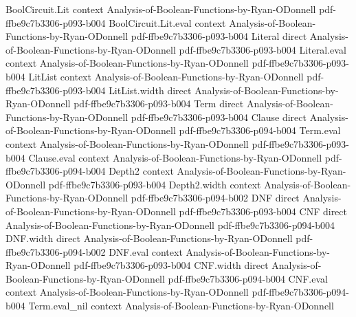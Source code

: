 \begin{theorem}
\leanok
{}
\proofstep
  {BoolCircuit.Lit}
  {context}
  {Analysis-of-Boolean-Functions-by-Ryan-ODonnell}
  {pdf-ffbe9c7b3306-p093-b004}
\proofstep
  {BoolCircuit.Lit.eval}
  {context}
  {Analysis-of-Boolean-Functions-by-Ryan-ODonnell}
  {pdf-ffbe9c7b3306-p093-b004}
\proofstep
  {Literal}
  {direct}
  {Analysis-of-Boolean-Functions-by-Ryan-ODonnell}
  {pdf-ffbe9c7b3306-p093-b004}
\proofstep
  {Literal.eval}
  {context}
  {Analysis-of-Boolean-Functions-by-Ryan-ODonnell}
  {pdf-ffbe9c7b3306-p093-b004}
\proofstep
  {LitList}
  {context}
  {Analysis-of-Boolean-Functions-by-Ryan-ODonnell}
  {pdf-ffbe9c7b3306-p093-b004}
\proofstep
  {LitList.width}
  {direct}
  {Analysis-of-Boolean-Functions-by-Ryan-ODonnell}
  {pdf-ffbe9c7b3306-p093-b004}
\proofstep
  {Term}
  {direct}
  {Analysis-of-Boolean-Functions-by-Ryan-ODonnell}
  {pdf-ffbe9c7b3306-p093-b004}
\proofstep
  {Clause}
  {direct}
  {Analysis-of-Boolean-Functions-by-Ryan-ODonnell}
  {pdf-ffbe9c7b3306-p094-b004}
\proofstep
  {Term.eval}
  {context}
  {Analysis-of-Boolean-Functions-by-Ryan-ODonnell}
  {pdf-ffbe9c7b3306-p093-b004}
\proofstep
  {Clause.eval}
  {context}
  {Analysis-of-Boolean-Functions-by-Ryan-ODonnell}
  {pdf-ffbe9c7b3306-p094-b004}
\proofstep
  {Depth2}
  {context}
  {Analysis-of-Boolean-Functions-by-Ryan-ODonnell}
  {pdf-ffbe9c7b3306-p093-b004}
\proofstep
  {Depth2.width}
  {context}
  {Analysis-of-Boolean-Functions-by-Ryan-ODonnell}
  {pdf-ffbe9c7b3306-p094-b002}
\proofstep
  {DNF}
  {direct}
  {Analysis-of-Boolean-Functions-by-Ryan-ODonnell}
  {pdf-ffbe9c7b3306-p093-b004}
\proofstep
  {CNF}
  {direct}
  {Analysis-of-Boolean-Functions-by-Ryan-ODonnell}
  {pdf-ffbe9c7b3306-p094-b004}
\proofstep
  {DNF.width}
  {direct}
  {Analysis-of-Boolean-Functions-by-Ryan-ODonnell}
  {pdf-ffbe9c7b3306-p094-b002}
\proofstep
  {DNF.eval}
  {context}
  {Analysis-of-Boolean-Functions-by-Ryan-ODonnell}
  {pdf-ffbe9c7b3306-p093-b004}
\proofstep
  {CNF.width}
  {direct}
  {Analysis-of-Boolean-Functions-by-Ryan-ODonnell}
  {pdf-ffbe9c7b3306-p094-b004}
\proofstep
  {CNF.eval}
  {context}
  {Analysis-of-Boolean-Functions-by-Ryan-ODonnell}
  {pdf-ffbe9c7b3306-p094-b004}
\proofstep
  {Term.eval_nil}
  {context}
  {Analysis-of-Boolean-Functions-by-Ryan-ODonnell}

\end{theorem}
